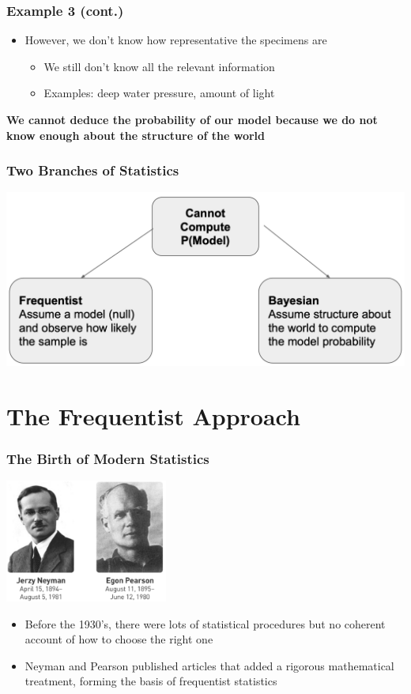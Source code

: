 \documentclass[12pt, block=fill]{beamer}
\begin{document}
\begin{frame}

\frametitle{Example 3 (cont.)}
  
    \begin{itemize}
        \item However, we don't know how representative the specimens are
        \begin{itemize}
            \item We still don't know all the relevant information
            \item Examples: deep water pressure, amount of light
        \end{itemize}
  \end{itemize}    
  \textbf{We cannot deduce the probability of our model because we do not know enough about the structure of the world} 
\end{frame}

\begin{frame}
  \frametitle{Two Branches of Statistics }
  \centering
  \includegraphics[width=.9\linewidth]{./figures/two_worlds}
\end{frame}

\section{The Frequentist Approach}

\begin{frame}
  \frametitle{The Birth of Modern Statistics}
    \begin{center}
        \includegraphics[width=0.4\textwidth]{figures/neyman_and_pearson.png}     
    \end{center}

  \begin{itemize}
      \item Before the 1930's, there were lots of statistical procedures but no coherent account of how to choose the right one
      \item Neyman and Pearson published articles that added a rigorous mathematical treatment, forming the basis of frequentist statistics
  \end{itemize}
\end{frame}
\end{document}

